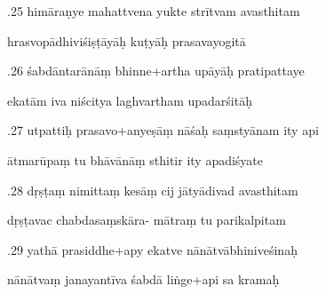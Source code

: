 \documentclass[article,12pt,a4paper]{memoir}%
\newcounter{parCount}
\begin{document}
	  
	  \pstart {}.25 himāraṇye mahattvena yukte strītvam avasthitam 
	{}
	\pend%
      

	  
	  \pstart \leavevmode%
	hrasvopādhiviśiṣṭāyāḥ kuṭyāḥ prasavayogitā 
	{}
	\pend%
      

	  
	  \pstart {}.26 śabdāntarānāṃ bhinne+artha upāyāḥ pratipattaye 
	{}
	\pend%
      

	  
	  \pstart \leavevmode%
	ekatām iva niścitya laghvartham upadarśitāḥ 
	{}
	\pend%
      

	  
	  \pstart {}.27 utpattiḥ prasavo+anyeṣāṃ nāśaḥ saṃstyānam ity api 
	{}
	\pend%
      

	  
	  \pstart \leavevmode%
	ātmarūpaṃ tu bhāvānāṃ sthitir ity apadiśyate 
	{}
	\pend%
      

	  
	  \pstart {}.28 dṛṣṭaṃ nimittaṃ kesāṃ cij jātyādivad avasthitam 
	{}
	\pend%
      

	  
	  \pstart \leavevmode%
	dṛṣṭavac chabdasaṃskāra- mātraṃ tu parikalpitam 
	{}
	\pend%
      

	  
	  \pstart {}.29 yathā prasiddhe+apy ekatve   nānātvābhiniveśinaḥ 
	{}
	\pend%
      

	  
	  \pstart \leavevmode%
	nānātvaṃ janayantīva śabdā liṅge+api sa kramaḥ 
	{}
	\pend%
      
\end{document}
